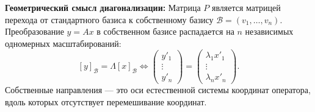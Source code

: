 \textbf{Геометрический смысл диагонализации:} Матрица $P$ является матрицей перехода от стандартного базиса к
собственному базису $\mathcal{B}=(v_1, \dots, v_n)$.
Преобразование $y = Ax$ в собственном базисе распадается на $n$ независимых одномерных масштабирований: \[
[y]_\mathcal{B} = \Lambda [x]_\mathcal{B} \iff \begin{pmatrix} y'_1 \\ \vdots \\ y'_n
    \end{pmatrix} = \begin{pmatrix}
\lambda_1 x'_1 \\ \vdots \\ \lambda_n x'_n
    \end{pmatrix}. \]
Собственные направления — это оси естественной системы координат оператора, вдоль которых отсутствует перемешивание
координат.

    \newpage